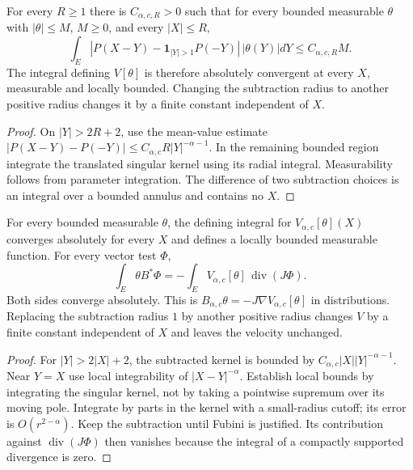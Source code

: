 \begin{lemma}
  \label{lem:c13_potential_convergence}
  For every $R\ge1$ there is $C_{\alpha,c,R}>0$ such that for every bounded measurable $\theta$
  with $|\theta|\le M$, $M\ge0$, and every $|X|\le R$,
  \[
    \int_E|P(X-Y)-\mathbf1_{|Y|>1}P(-Y)|\,|\theta(Y)|dY\le C_{\alpha,c,R}M.
  \]
  The integral defining $V[\theta]$ is therefore absolutely convergent at every $X$, measurable
  and locally bounded. Changing the subtraction radius to another positive radius changes it
  by a finite constant independent of $X$.
\end{lemma}
\begin{proof}
  On $|Y|>2R+2$, use the mean-value estimate
  $|P(X-Y)-P(-Y)|\le C_{\alpha,c}R|Y|^{-\alpha-1}$.
  In the remaining bounded region integrate the translated singular kernel using its radial
  integral. Measurability follows from parameter integration. The difference of two subtraction
  choices is an integral over a bounded annulus and contains no $X$.
\end{proof}

\begin{lemma}
  \label{lem:c13_renormalized_potential}
  For every bounded measurable $\theta$, the defining integral for $V_{\alpha,c}[\theta](X)$
  converges absolutely for every $X$ and defines a locally bounded measurable function.
  For every vector test $\Phi$,
  \[
    \int_E\theta B^*\Phi=-\int_E V_{\alpha,c}[\theta]\,\operatorname{div}(J\Phi).
  \]
  Both sides converge absolutely. This is $B_{\alpha,c}\theta=-J\nabla V_{\alpha,c}[\theta]$
  in distributions. Replacing the subtraction radius $1$ by another positive radius changes
  $V$ by a finite constant independent of $X$ and leaves the velocity unchanged.
\end{lemma}
\begin{proof}
  For $|Y|>2|X|+2$, the subtracted kernel is bounded by
  $C_{\alpha,c}|X||Y|^{-\alpha-1}$. Near $Y=X$ use local integrability of $|X-Y|^{-\alpha}$.
  Establish local bounds by integrating the singular kernel, not by taking a pointwise supremum over its moving pole.
  Integrate by parts in the kernel with a small-radius cutoff; its error is $O(r^{2-\alpha})$.
  Keep the subtraction until Fubini is justified. Its contribution against $\operatorname{div}(J\Phi)$
  then vanishes because the integral of a compactly supported divergence is zero.
\end{proof}

